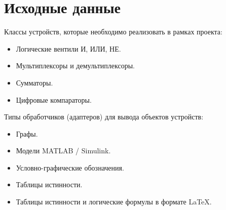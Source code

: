 \documentclass[document.tex]{subfiles}
\begin{document}
\clearpage
\section{Исходные данные}
\noindent
Классы устройств, которые необходимо реализовать в рамках проекта:
\begin{itemize}[noitemsep]
  \item Логические вентили И, ИЛИ, НЕ.
  \item Мультиплексоры и демультиплексоры.
  \item Сумматоры.
  \item Цифровые компараторы.
\end{itemize}
Типы обработчиков (адаптеров) для вывода объектов устройств:
\begin{itemize}[noitemsep]
  \item Графы.
  \item Модели MATLAB / Simulink.
  \item Условно-графические обозначения.
  \item Таблицы истинности.
  \item Таблицы истинности и логические формулы в формате \LaTeX.
\end{itemize}
\end{document}
